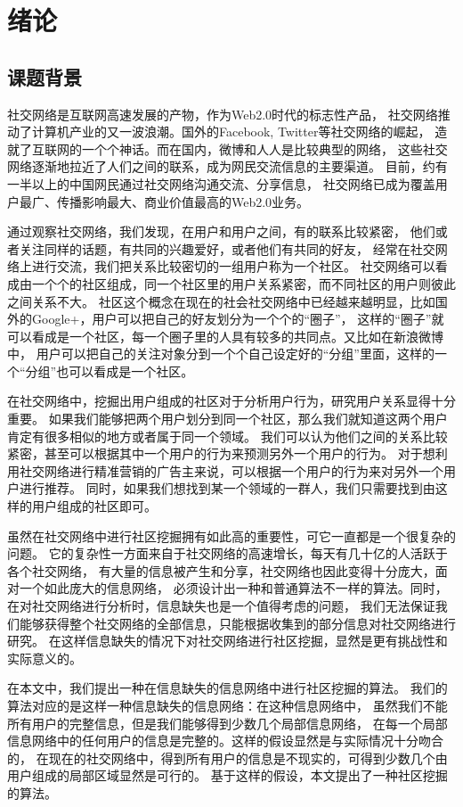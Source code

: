 \chapter{绪论}
\label{chap:intro}

\section{课题背景}

社交网络是互联网高速发展的产物，作为Web2.0时代的标志性产品，
社交网络推动了计算机产业的又一波浪潮。国外的Facebook, Twitter等社交网络的崛起，
造就了互联网的一个个神话。而在国内，微博和人人是比较典型的网络，
这些社交网络逐渐地拉近了人们之间的联系，成为网民交流信息的主要渠道。
目前，约有一半以上的中国网民通过社交网络沟通交流、分享信息，
社交网络已成为覆盖用户最广、传播影响最大、商业价值最高的Web2.0业务。

通过观察社交网络，我们发现，在用户和用户之间，有的联系比较紧密，
他们或者关注同样的话题，有共同的兴趣爱好，或者他们有共同的好友，
经常在社交网络上进行交流，我们把关系比较密切的一组用户称为一个社区。
社交网络可以看成由一个个的社区组成，同一个社区里的用户关系紧密，而不同社区的用户则彼此之间关系不大。
社区这个概念在现在的社会社交网络中已经越来越明显，比如国外的Google+，用户可以把自己的好友划分为一个个的“圈子”，
这样的“圈子”就可以看成是一个社区，每一个圈子里的人具有较多的共同点。又比如在新浪微博中，
用户可以把自己的关注对象分到一个个自己设定好的“分组”里面，这样的一个“分组”也可以看成是一个社区。

在社交网络中，挖掘出用户组成的社区对于分析用户行为，研究用户关系显得十分重要。
如果我们能够把两个用户划分到同一个社区，那么我们就知道这两个用户肯定有很多相似的地方或者属于同一个领域。
我们可以认为他们之间的关系比较紧密，甚至可以根据其中一个用户的行为来预测另外一个用户的行为。
对于想利用社交网络进行精准营销的广告主来说，可以根据一个用户的行为来对另外一个用户进行推荐。
同时，如果我们想找到某一个领域的一群人，我们只需要找到由这样的用户组成的社区即可。

虽然在社交网络中进行社区挖掘拥有如此高的重要性，可它一直都是一个很复杂的问题。
它的复杂性一方面来自于社交网络的高速增长，每天有几十亿的人活跃于各个社交网络，
有大量的信息被产生和分享，社交网络也因此变得十分庞大，面对一个如此庞大的信息网络，
必须设计出一种和普通算法不一样的算法。同时，在对社交网络进行分析时，信息缺失也是一个值得考虑的问题，
我们无法保证我们能够获得整个社交网络的全部信息，只能根据收集到的部分信息对社交网络进行研究。
在这样信息缺失的情况下对社交网络进行社区挖掘，显然是更有挑战性和实际意义的。

在本文中，我们提出一种在信息缺失的信息网络中进行社区挖掘的算法。
我们的算法对应的是这样一种信息缺失的信息网络：在这种信息网络中，
虽然我们不能所有用户的完整信息，但是我们能够得到少数几个局部信息网络，
在每一个局部信息网络中的任何用户的信息是完整的。这样的假设显然是与实际情况十分吻合的，
在现在的社交网络中，得到所有用户的信息是不现实的，可得到少数几个由用户组成的局部区域显然是可行的。
基于这样的假设，本文提出了一种社区挖掘的算法。

